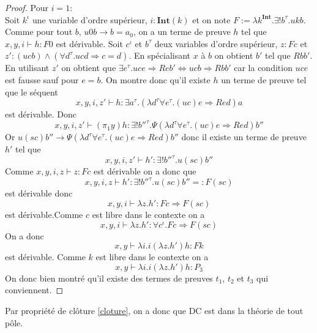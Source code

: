 \documentclass[a4paper,12pt]{article}
\theoremstyle{rmqstyle}
\renewcommand{\int}{\mathbf{Int}}
\renewcommand{\implies}{\Rightarrow}
\renewcommand{\iff}{\Leftrightarrow}
\newcommand{\DC}{\mathrm{DC}}
\begin{document}
\begin{proof}
Pour $i = 1$:\\
Soit $k^\iota$ une variable d'ordre supérieur, $i : \int(k)$ et on note $F := \lambda k^\int. \exists ! b^\tau. ukb$. Comme pour tout $b$, $u 0 b \longrightarrow b = a_0$, on a un terme de preuve $h$ tel que $x,y,i \vdash h : F0$ est dérivable. Soit $c^\iota$ et $b^\tau$ deux variables d'ordre supérieur, $z : Fc$ et $z' : (ucb) \land (\forall d^\tau. ucd \implies c =d)$. En spécialisant $x$ à $b$ on obtient $b'$ tel que $Rbb'$. En utilisant $z'$ on obtient que $\exists e^\tau. uce \implies Reb' \iff ucb \implies Rbb'$ car la condition $uce$ est fausse sauf pour $e = b$. On montre donc qu'il existe $h$ un terme de preuve tel que le séquent 
$$x,y,i,z' \vdash h : \exists a^\tau. (\lambda d^\tau \forall e^\tau. (uc) e \implies Red) a$$
est dérivable. Donc
$$x,y,i,z' \vdash (\pi_1y) h : \exists ! b''^\tau. \Psi (\lambda d^\tau \forall e^\tau. (uc) e \implies Red) b''$$
Or $u (sc) b'' \longrightarrow \Psi (\lambda d^\tau \forall e^\tau. (uc) e \implies Red) b''$ donc il existe un terme de preuve $h'$ tel que 
$$x,y,i,z' \vdash h' : \exists ! b''^\tau. u(sc) b''$$
Comme $x,y,i,z \vdash z : Fc$ est dérivable on a donc que 
$$x,y,i,z \vdash h' : \exists ! b''^\tau. u(sc) b'' =: F(sc)$$
est dérivable donc
$$x,y,i \vdash \lambda z. h' : Fc \implies F(sc)$$
est dérivable.Comme $c$ est libre dans le contexte on a 
$$x,y, i \vdash  \lambda z. h' : \forall c^\iota. Fc \implies F(sc)$$
On a donc
$$x,y \vdash \lambda i. i (\lambda z. h') h : Fk$$
est dérivable. Comme $k$ est libre dans le contexte on a
$$x,y \vdash \lambda i. i (\lambda z. h') h : P_3$$
On donc bien montré qu'il existe des termes de preuves $t_1$, $t_2$ et $t_3$ qui conviennent. 
\end{proof}

Par propriété de clôture \ref{cloture}, on a donc que $\DC$ est dans la théorie de tout pôle.


\clearpage




\end{document}

